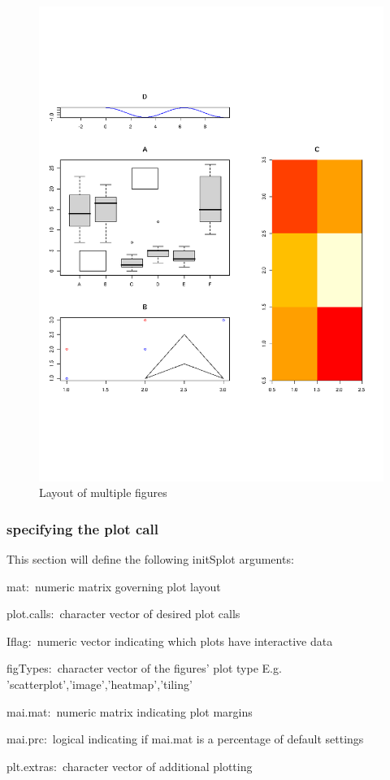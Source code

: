 \documentclass[]{article}
\begin{document}
\newpage
\begin{center}
\begin{figure}
\includegraphics{FirstLookEx}
\caption{Layout of multiple figures}
\end{figure}
\end{center}

\subsubsection{specifying the plot call}

This section will define the following initSplot arguments:

\begin{description}
   \item{mat:~}{numeric matrix governing plot layout}
   \item{plot.calls:~}{character vector of desired plot calls}
   \item{Iflag:~}{numeric vector indicating which plots have interactive data}
   \item{figTypes:~}{character vector of the figures' plot type E.g. 'scatterplot','image','heatmap','tiling'}
   \item{mai.mat:~}{numeric matrix indicating plot margins}
   \item{mai.prc:~}{logical indicating if mai.mat is a percentage of default settings}
   \item{plt.extras:~}{character vector of additional plotting}
\end{description}
\end{document}
